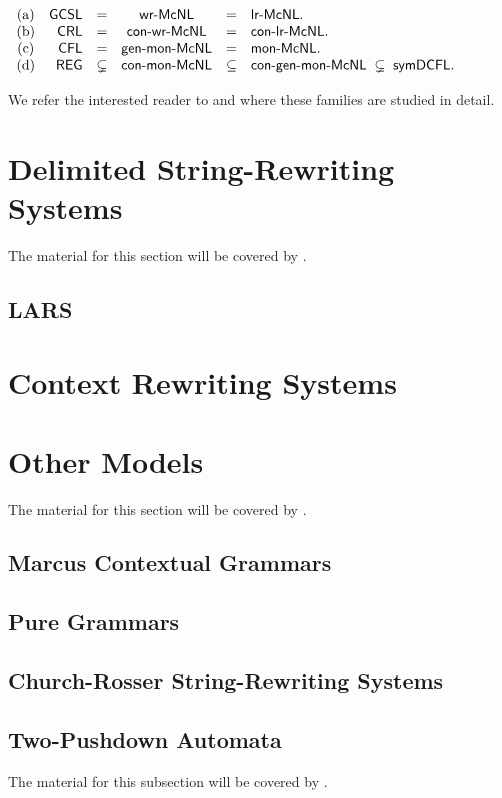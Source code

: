 \begin{theorem}{\rm \cite{Beaudry2003,Leupold2011}}\label{ThmMcNL}\\[+0.2cm]
$\begin{array}[t]{crcccl}
{\rm (a)} & \GCSL & = & \wrMcNL & = & \lrMcNL.\\
{\rm (b)} & \CRL  & = & \conwrMcNL & = & \conlrMcNL.\\
{\rm (c)} & \CFL  & = & \mbox{\sf gen-mon-McNL} & = & \mbox{\sf mon-McNL}.\\
{\rm (d)} & \REG  & \subsetneq & \mbox{\sf con-mon-McNL} & \subseteq & 
\mbox{\sf con-gen-mon-McNL}\; \subsetneq\; \symDCFL.
\end{array}$
\end{theorem}

We refer the interested reader 
to \cite{Beaudry2003} and \cite{Leupold2011} where these families are studied in detail. 

\section{Delimited String-Rewriting Systems}
\label{section:delimited-string-rewriting-systems}

The material for this section will be covered by \cite{delaHiguera2010, Eyraud2007}.

\subsection{LARS}

\section{Context Rewriting Systems}
\label{section:context-rewriting-systems}

\section{Other Models}
\label{section:other-models}

The material for this section will be covered by \cite{C10Diploma}.

\subsection{Marcus Contextual Grammars}

\subsection{Pure Grammars}

\subsection{Church-Rosser String-Rewriting Systems}

\subsection{Two-Pushdown Automata}

The material for this subsection will be covered by \cite{NO98}.